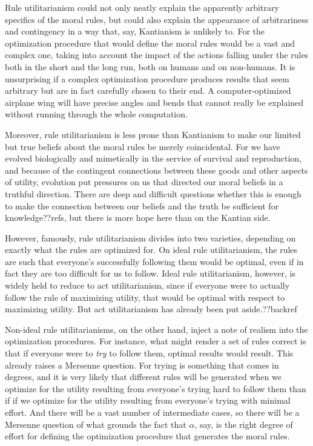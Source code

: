 Rule utilitarianism could not only neatly explain the
apparently arbitrary specifics of the moral rules, but could also explain the appearance of arbitrariness and contingency
in a way that, say, Kantianism is unlikely to. For the optimization procedure that would define the moral rules would be a vast
and complex one, taking into account the impact of the actions falling under the rules both in the short and the long run, 
both on humans and on non-humans. It is unsurprising if a complex optimization procedure produces results that seem
arbitrary but are in fact carefully chosen to their end. A computer-optimized airplane wing will have precise angles and
bends that cannot really be explained without running through the whole computation.

Moreover, rule utilitarianism is less prone than Kantianism to make our limited but true beliefs about the moral rules be 
merely coincidental. For we have evolved biologically and mimetically in the service of survival and reproduction, and 
because of the contingent connections between these goods and other aspects of utility, evolution put pressures on us 
that directed our moral beliefs in a truthful direction. There are deep and difficult questions whether this is enough
to make the connection between our beliefs and the truth be sufficient for knowledge??refs, but there is more hope here
than on the Kantian side.

However, famously, rule utilitarianism divides into two varieties, depending on exactly what the rules are optimized for.
On ideal rule utilitarianism, the rules are such that everyone's successfully following them would be optimal, even if in
fact they are too difficult for us to follow. Ideal rule utilitarianism, however, is widely held to reduce to act
utilitarianism, since if everyone were to actually follow the rule of maximizing utility, that would be optimal
with respect to maximizing utility. But act utilitarianism has already been put aside.??backref

Non-ideal rule utilitarianisms, on the other hand, inject a note of realism into the optimization procedures. For instance,
what might render a set of rules correct is that if everyone were to \textit{try} to follow them, optimal results would
result. This already raises a Mersenne question. For trying is something that comes in degrees, and it is very likely that
different rules will be generated when we optimize for the utility resulting from everyone's trying hard to follow them
than if if we optimize for the utility resulting from everyone's trying with minimal effort. And there will be a vast
number of intermediate cases, so there will be a Mersenne question of what grounds the fact that $\alpha$, say, is
the right degree of effort for defining the optimization procedure that generates the moral rules.

